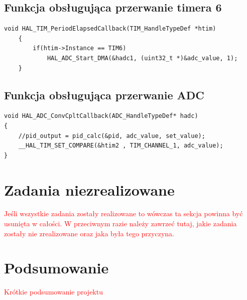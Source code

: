 \documentclass[10pt, a4paper]{article}
\begin{document}
\subsection{Funkcja obsługująca przerwanie timera 6}
	\begin{lstlisting}[tabsize=2]
	void HAL_TIM_PeriodElapsedCallback(TIM_HandleTypeDef *htim)
	{
		if(htim->Instance == TIM6)
			HAL_ADC_Start_DMA(&hadc1, (uint32_t *)&adc_value, 1);
	}
	\end{lstlisting}

\subsection{Funkcja obsługująca przerwanie ADC}
\begin{lstlisting}[tabsize=2]
void HAL_ADC_ConvCpltCallback(ADC_HandleTypeDef* hadc)
{
	//pid_output = pid_calc(&pid, adc_value, set_value);
	__HAL_TIM_SET_COMPARE(&htim2 , TIM_CHANNEL_1, adc_value);
}
\end{lstlisting}

\section{Zadania niezrealizowane}
\textcolor{red}{Jeśli wszystkie zadania zostały realizowane to wówczas 
	ta sekcja powinna być usunięta w całości. W przeciwnym razie
	należy zawrzeć tutaj, jakie zadania zostały nie zrealizowane 
	oraz jaka była tego przyczyna.
}

\section{Podsumowanie}
\textcolor{red}{Krótkie podsumowanie projektu}


\newpage
{}


\end{document}
